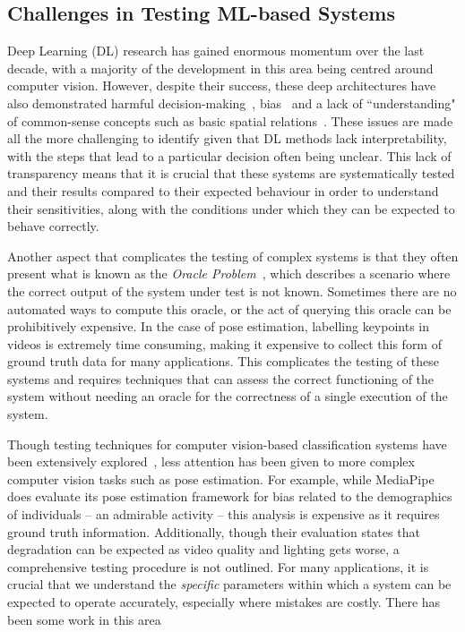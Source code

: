 \subsection{Challenges in Testing ML-based Systems}
\label{sec:bg:MLTesting}
Deep Learning (DL) research has gained enormous momentum over the last decade, with a majority of the development in this area being centred around computer vision. However, despite their success, these deep architectures have also demonstrated harmful decision-making~\cite{birhane2024dark, birhane2022auditing,weidinger2021ethical}, bias~\cite{raji2020saving} and a lack of ``understanding" of common-sense concepts such as basic spatial relations~\cite{hoehing2023s, liu2023visual}. These issues are made all the more challenging to identify given that DL methods lack interpretability, with the steps that lead to a particular decision often being unclear. This lack of transparency means that it is crucial that these systems are systematically tested and their results compared to their expected behaviour in order to understand their sensitivities, along with the conditions under which they can be expected to behave correctly. 

Another aspect that complicates the testing of complex systems is that they often present what is known as the \textit{Oracle Problem}~\cite{barr2014oracle}, which describes a scenario where the correct output of the system under test is not known. Sometimes there are no automated ways to compute this oracle, or the act of querying this oracle can be prohibitively expensive. In the case of pose estimation, labelling keypoints in videos is extremely time consuming, making it expensive to collect this form of ground truth data for many applications. This complicates the testing of these systems and requires techniques that can assess the correct functioning of the system without needing an oracle for the correctness of a single execution of the system. 


Though testing techniques for computer vision-based classification systems have been extensively explored~\cite{ma2018deepmutation, dwarakanath2018identifying, ma2018deepgauge}, less attention has been given to more complex computer vision tasks such as pose estimation. For example, while MediaPipe does evaluate its pose estimation framework for bias related to the demographics of individuals -- an admirable activity -- this analysis is expensive as it requires ground truth information. Additionally, though their evaluation states that degradation can be expected as video quality and lighting gets worse, a comprehensive testing procedure is not outlined. For many applications, it is crucial that we understand the \textit{specific} parameters within which a system can be expected to operate accurately, especially where mistakes are costly.  There has been some work in this area~\cite{hand-pose}


